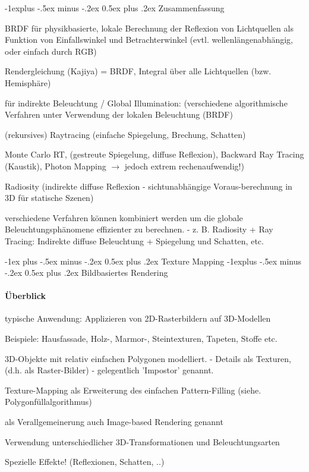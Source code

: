 \documentclass[landscape]{article}
\makeatletter
\renewcommand{\section}{\@startsection{section}{1}{0mm}%
                                {-1ex plus -.5ex minus -.2ex}%
                                {0.5ex plus .2ex}%
                                {\normalfont\large\bfseries}}
\renewcommand{\subsection}{\@startsection{subsection}{2}{0mm}%
                                {-1explus -.5ex minus -.2ex}%
                                {0.5ex plus .2ex}%
                                {\normalfont\normalsize\bfseries}}
\makeatother
\begin{document}
\begin{multicols}{3}
  \subsection{ Zusammenfassung}
  \begin{itemize*}
    \item BRDF für physikbasierte, lokale Berechnung der Reflexion von Lichtquellen als Funktion von Einfallswinkel und Betrachterwinkel (evtl. wellenlängenabhängig, oder einfach durch RGB)
    \item Rendergleichung (Kajiya) = BRDF, Integral über alle Lichtquellen (bzw. Hemisphäre)
    \item für indirekte Beleuchtung / Global Illumination: (verschiedene algorithmische Verfahren unter Verwendung der lokalen Beleuchtung (BRDF)
    \item (rekursives) Raytracing (einfache Spiegelung, Brechung, Schatten)
    \item Monte Carlo RT, (gestreute Spiegelung, diffuse Reflexion), Backward Ray Tracing (Kaustik), Photon Mapping $\rightarrow$ jedoch extrem rechenaufwendig!)
    \item Radiosity (indirekte diffuse Reflexion - sichtunabhängige Voraus-berechnung in 3D für statische Szenen)
    \item verschiedene Verfahren können kombiniert werden um die globale Beleuchtungsphänomene effizienter zu berechnen. - z. B. Radiosity + Ray Tracing: Indirekte diffuse Beleuchtung + Spiegelung und Schatten, etc.
  \end{itemize*}
  
  \newpage
  \section{Texture Mapping}
  \subsection{ Bildbasiertes Rendering}
  \paragraph{Überblick}
  \begin{itemize*}
    \item typische Anwendung: Applizieren von 2D-Rasterbildern auf 3D-Modellen
    \item Beispiele: Hausfassade, Holz-, Marmor-, Steintexturen, Tapeten, Stoffe etc.
    \item 3D-Objekte mit relativ einfachen Polygonen modelliert. - Details als Texturen, (d.h. als Raster-Bilder) - gelegentlich 'Impostor' genannt.
    \item Texture-Mapping als Erweiterung des einfachen Pattern-Filling (siehe. Polygonfüllalgorithmus)
    \item als Verallgemeinerung auch Image-based Rendering genannt
    \item Verwendung unterschiedlicher 3D-Transformationen und Beleuchtungsarten
    \item Spezielle Effekte! (Reflexionen, Schatten, ..)
  \end{itemize*}
  

\end{multicols}
\end{document}
